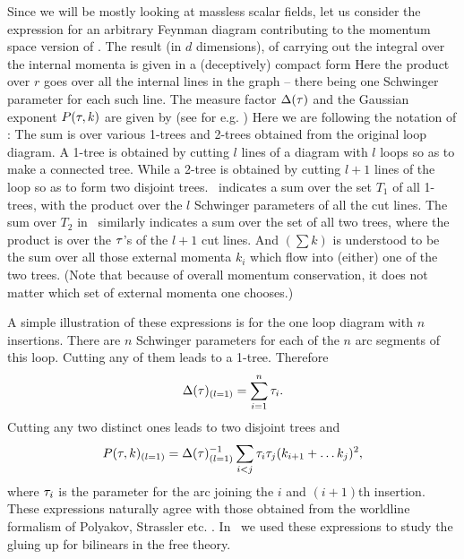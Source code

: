 Since we will be mostly looking at massless scalar fields, let us 
consider the expression for an arbitrary Feynman diagram contributing 
to the momentum space version of \ncorr .
The result (in $d$ dimensions), of
carrying out the integral over the internal momenta is given in a
(deceptively) compact form
%
\eqn{}
%
Here the product over $r$ goes over all the internal lines in the
graph -- there being one Schwinger parameter for each such line.
The measure factor ${\Delta} ({\tau})$ and the Gaussian exponent $P({\tau}, k)$
are given by (see for e.g. \iz\lam )
\eqn{} \eqn{} Here we are
following the notation of \lam : The sum is over various 1-trees
and 2-trees obtained from the original loop diagram. A 1-tree is
obtained by cutting $l$ lines of a diagram with $l$ loops so as to
make a connected tree. While a 2-tree is obtained by cutting $l+1$
lines of the loop so as to form two disjoint trees. \meas\
indicates a sum over the set $T_1$ of all 1-trees, with the
product over the $l$ Schwinger parameters of all the cut lines.
The sum over $T_2$ in \gauss\ similarly indicates a sum over the
set of all two trees, where the product is over the ${\tau}$'s of the
$l+1$ cut lines. And $(\sum k)$ is understood to be the sum over
all those external momenta $k_i$ which flow into (either) one of
the two trees. (Note that because of overall momentum
conservation, it does not matter which set of external momenta one
chooses.)

A simple illustration of these expressions is for the one loop diagram
with $n$ insertions. There are $n$ Schwinger parameters for each of the
$n$ arc segments of this loop. Cutting any of them leads to a 1-tree.
Therefore
$${\Delta}({\tau})_{(l=1)}=\sum_{i=1}^n {\tau}_i.$$
Cutting any two distinct ones leads to two disjoint trees and
$$P({\tau},k)_{(l=1)}={\Delta}({\tau})_{(l=1)}^{-1}\sum_{i<j}{\tau}_i{\tau}_j(k_{i+1}+\ldots k_j)^2,$$
where ${\tau}_i$ is the parameter for the arc joining the $i$ and $(i+1)$th insertion.
These expressions naturally
agree with those obtained from the worldline formalism of Polyakov, Strassler etc.
\polbk\strass\schb . In \ff\ we used these expressions to study the gluing up for
bilinears in the free theory.

